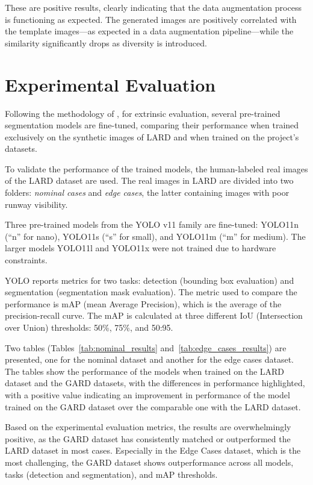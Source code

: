 These are positive results, clearly indicating that the data augmentation process is functioning as expected. 
The generated images are positively correlated with the template images—as expected in a data augmentation pipeline—while the similarity significantly drops as diversity is introduced.

\FloatBarrier
\section{Experimental Evaluation}

Following the methodology of \cite{voetman_big_2023}, for extrinsic evaluation, several pre-trained segmentation models are fine-tuned, comparing their performance when trained exclusively on the synthetic images of LARD \cite{ducoffe_lard_2023} and when trained on the project's datasets.

To validate the performance of the trained models, the human-labeled real images of the LARD dataset are used. The real images in LARD are divided into two folders: \emph{nominal cases} and \emph{edge cases}, the latter containing images with poor runway visibility.

Three pre-trained models from the YOLO v11 family are fine-tuned: YOLO11n (``n'' for nano), YOLO11s (``s'' for small), and YOLO11m (``m'' for medium). The larger models YOLO11l and YOLO11x were not trained due to hardware constraints.

YOLO reports metrics for two tasks: detection (bounding box evaluation) and
segmentation (segmentation mask evaluation). The metric used to compare the
performance is mAP (mean Average Precision), which is the average of the
precision-recall curve. The mAP is calculated at three different IoU (Intersection over Union) thresholds: 50\%, 75\%, and 50:95.

Two tables (Tables~\ref{tab:nominal_results} and~\ref{tab:edge_cases_results}) are presented, one for the nominal dataset and another for the edge
cases dataset. The tables show the performance of the models when trained on the
LARD dataset and the GARD datasets, with the differences in performance
highlighted, with a positive value indicating an improvement in performance of
the model trained on the GARD dataset over the comparable one with the LARD dataset.

Based on the experimental evaluation metrics, the results are overwhelmingly
positive, as the GARD dataset has consistently 
matched or outperformed the LARD dataset in most cases. Especially in the
Edge Cases dataset, which is the most challenging, the GARD dataset shows
outperformance across all models, tasks (detection and segmentation), and mAP
thresholds.

